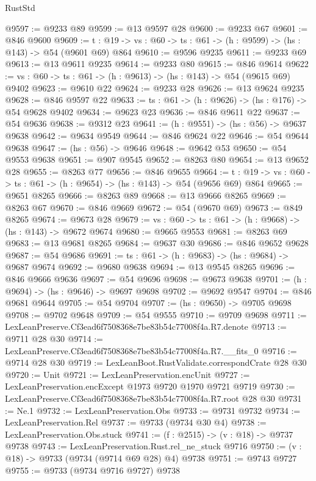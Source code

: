 \begin{lexlean}{RustStd}
\begin{coremodule}
@9597 := @9233 @89
@9599 := @13 @9597 @28
@9600 := @9233 @67
@9601 := @846 @9600
@9609 := {t : @19} -> {vs : @60} -> {ts : @61} -> (h : @9599) -> (hs : @143) -> @54 (@9601 @69) @864
@9610 := @9596 @9235
@9611 := @9233 @69
@9613 := @13 @9611 @9235
@9614 := @9233 @80
@9615 := @846 @9614
@9622 := {vs : @60} -> {ts : @61} -> (h : @9613) -> (hs : @143) -> @54 (@9615 @69) @9402
@9623 := @9610 @22
@9624 := @9233 @28
@9626 := @13 @9624 @9235
@9628 := @846 @9597 @22
@9633 := {ts : @61} -> (h : @9626) -> (hs : @176) -> @54 @9628 @9402
@9634 := @9623 @23
@9636 := @846 @9611 @22
@9637 := @54 @9636
@9638 := @9312 @23
@9641 := (h : @9551) -> (hs : @56) -> @9637 @9638
@9642 := @9634 @9549
@9644 := @846 @9624 @22
@9646 := @54 @9644 @9638
@9647 := (hs : @56) -> @9646
@9648 := @9642 @53
@9650 := @54 @9553 @9638
@9651 := @907 @9545
@9652 := @8263 @80
@9654 := @13 @9652 @28
@9655 := @8263 @77
@9656 := @846 @9655
@9664 := {t : @19} -> {vs : @60} -> {ts : @61} -> (h : @9654) -> (hs : @143) -> @54 (@9656 @69) @864
@9665 := @9651 @8265
@9666 := @8263 @89
@9668 := @13 @9666 @8265
@9669 := @8263 @67
@9670 := @846 @9669
@9672 := @54 (@9670 @69)
@9673 := @849 @8265
@9674 := @9673 @28
@9679 := {vs : @60} -> {ts : @61} -> (h : @9668) -> (hs : @143) -> @9672 @9674
@9680 := @9665 @9553
@9681 := @8263 @69
@9683 := @13 @9681 @8265
@9684 := @9637 @30
@9686 := @846 @9652 @9628
@9687 := @54 @9686
@9691 := {ts : @61} -> (h : @9683) -> (hs : @9684) -> @9687 @9674
@9692 := @9680 @9638
@9694 := @13 @9545 @8265
@9696 := @846 @9666 @9636
@9697 := @54 @9696
@9698 := @9673 @9638
@9701 := (h : @9694) -> (hs : @9646) -> @9697 @9698
@9702 := @9692 @9547
@9704 := @846 @9681 @9644
@9705 := @54 @9704
@9707 := (hs : @9650) -> @9705 @9698
@9708 := @9702 @9648
@9709 := @54 @9555
@9710 := @9709 @9698
@9711 := LexLeanPreserve.Cf3ead6f7508368e7be83b54c77008f4a.R7.denote
@9713 := @9711 @28 @30
@9714 := LexLeanPreserve.Cf3ead6f7508368e7be83b54c77008f4a.R7.__fits_0
@9716 := @9714 @28 @30
@9719 := LexLeanBoot.RustValidate.correspondCrate @28 @30
@9720 := Unit
@9721 := LexLeanPreservation.encUnit
@9727 := LexLeanPreservation.encExcept @1973 @9720 @1970 @9721 @9719
@9730 := LexLeanPreserve.Cf3ead6f7508368e7be83b54c77008f4a.R7.root @28 @30
@9731 := Ne.{1}
@9732 := LexLeanPreservation.Obs
@9733 := @9731 @9732
@9734 := LexLeanPreservation.Rel
@9737 := @9733 (@9734 @30 @4)
@9738 := LexLeanPreservation.Obs.stuck
@9741 := (f : @2515) -> (v : @18) -> @9737 @9738
@9743 := LexLeanPreservation.Rust.rel_ne_stuck @9716
@9750 := (v : @18) -> @9733 (@9734 (@9714 @69 @28) @4) @9738
@9751 := @9743 @9727
@9755 := @9733 (@9734 @9716 @9727) @9738

\end{coremodule}
\end{lexlean}
